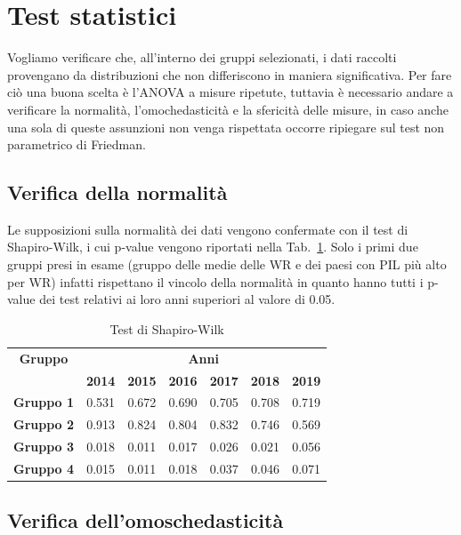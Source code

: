 \documentclass[conference]{IEEEtran}
\begin{document}
\section{Test statistici}

Vogliamo verificare che, all'interno dei gruppi selezionati,
i dati raccolti provengano da distribuzioni che non differiscono
in maniera significativa.
Per fare ciò una buona scelta è l'ANOVA a misure ripetute,
tuttavia è necessario andare a verificare la normalità,
l'omochedasticità e la sfericità delle misure, in caso
anche una sola di queste assunzioni non venga rispettata occorre
ripiegare sul test non parametrico di Friedman.

\subsection{Verifica della normalità}

Le supposizioni sulla normalità dei dati vengono confermate
con il test di Shapiro-Wilk, i cui p-value vengono riportati nella Tab.~\ref{tab1}.
Solo i primi due gruppi presi in esame (gruppo delle medie delle WR e dei paesi con PIL più alto per WR)
infatti rispettano il vincolo della normalità
in quanto hanno tutti i p-value dei test relativi ai loro anni superiori al valore di 0.05.
\begin{table}[htbp]
    \caption{Test di Shapiro-Wilk}
    \begin{center}
    \begin{tabular}{|c|c|c|c|c|c|c|}
    \hline
    \textbf{Gruppo}&\multicolumn{6}{|c|}{\textbf{Anni}} \\
    \cline{2-7} 
     & \textbf{2014} & \textbf{2015} & \textbf{2016} & \textbf{2017} & \textbf{2018} & \textbf{2019}\\
    \hline
    \textbf{Gruppo 1} & 0.531 & 0.672 & 0.690 & 0.705 & 0.708 & 0.719 \\\cline{1-7}
    \textbf{Gruppo 2} & 0.913 & 0.824 & 0.804 & 0.832 & 0.746 & 0.569 \\\cline{1-7}
    \textbf{Gruppo 3} & 0.018 & 0.011 & 0.017 & 0.026 & 0.021 & 0.056 \\\cline{1-7}
    \textbf{Gruppo 4} & 0.015 & 0.011 & 0.018 & 0.037 & 0.046 & 0.071 \\\cline{1-7}
    \hline
    \end{tabular}
    \label{tab1}
    \end{center}
\end{table}

\subsection{Verifica dell'omoschedasticità}
\end{document}
